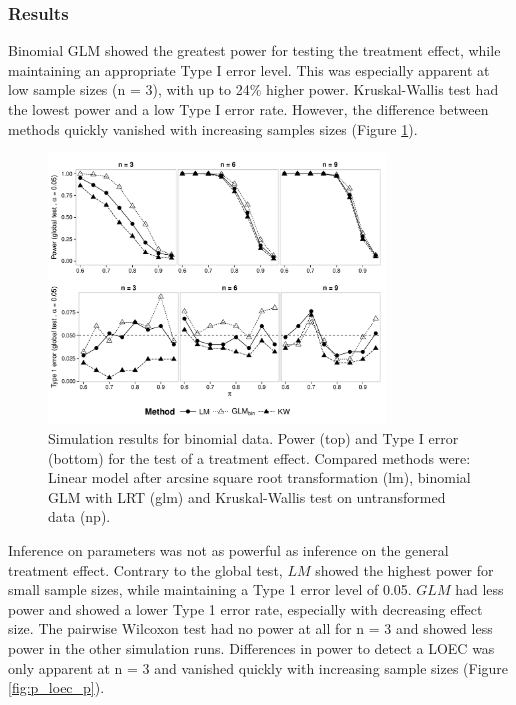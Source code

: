 \documentclass{scrartcl}
\begin{document}
\subsubsection{Results}
Binomial GLM showed the greatest power for testing the treatment effect, while maintaining an appropriate Type I error level.
This was especially apparent at low sample sizes (n = 3), with up to 24\% higher power.
Kruskal-Wallis test had the lowest power and a low Type I error rate.
However, the difference between methods quickly vanished with increasing samples sizes (Figure \ref{fig:p_glob_p}).

\begin{figure}[h]
  \centering
  \includegraphics[width = 0.8\textwidth]{p_glob_p.pdf}
  \caption{Simulation results for binomial data. Power (top) and Type I error (bottom) for the test of a treatment effect. Compared methods were: Linear model after arcsine square root transformation (lm), binomial GLM with LRT (glm) and Kruskal-Wallis test on untransformed data (np).}
  \label{fig:p_glob_p}
\end{figure}

Inference on parameters was not as powerful as inference on the general treatment effect.
Contrary to the global test, $LM$ showed the highest power for small sample sizes, while maintaining a Type 1 error level of 0.05.
$GLM$ had less power and showed a lower Type 1 error rate, especially with decreasing effect size.
The pairwise Wilcoxon test had no power at all for n = 3 and showed less power in the other simulation runs.
Differences in power to detect a LOEC was only apparent at n = 3 and vanished quickly with increasing sample sizes (Figure \ref{fig:p_loec_p}). 
\end{document}
